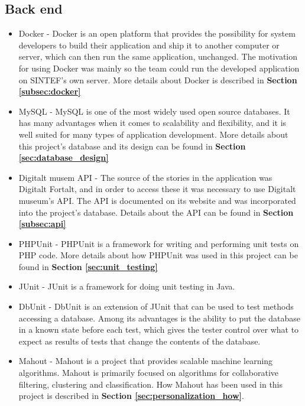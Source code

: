 \subsection{Back end}
\begin{itemize}
	\item Docker \cite{EHW2} - Docker is an open platform that provides the possibility for system developers to build their application and ship it to another computer or server, which can then run the same application, unchanged. The motivation for using Docker was mainly so the team could run the developed application on SINTEF’s own server. More details about Docker is described in \textbf{Section \ref{subsec:docker}}
	\item MySQL \cite{es8} - MySQL is one of the most widely used open source databases. It has many advantages when it comes to scalability and flexibility, and it is well suited for many types of application development. More details about this project’s database and its design can be found in \textbf{Section \ref{sec:database_design}}
	\item Digitalt musem API \cite{digitaltMuseum} - The source of the stories in the application was Digitalt Fortalt, and in order to access these it was necessary to use Digitalt museum’s API. The API is documented on its website and was incorporated into the project’s database. Details about the API can be found in \textbf{Section \ref{subsec:api}}
	\item PHPUnit \cite{KF2} - PHPUnit is a framework for writing and performing unit tests on PHP code. More details about how PHPUnit was used in this project can be found in \textbf{Section \ref{sec:unit_testing}}
	\item JUnit \cite{jUnit} - JUnit is a framework for doing unit testing in Java. 
	\item DbUnit \cite{dbUnit} - DbUnit is an extension of JUnit that can be used to test methods accessing a database. Among its advantages is the ability to put the database in a known state before each test, which gives the tester control over what to expect as results of tests that change the contents of the database.
	\item Mahout \cite{as9}  - Mahout is a project that provides scalable machine learning algorithms. Mahout is primarily focused on algorithms for collaborative filtering, clustering and classification. How Mahout has been used in this project is described in \textbf{Section \ref{sec:personalization_how}}.
\end{itemize}


